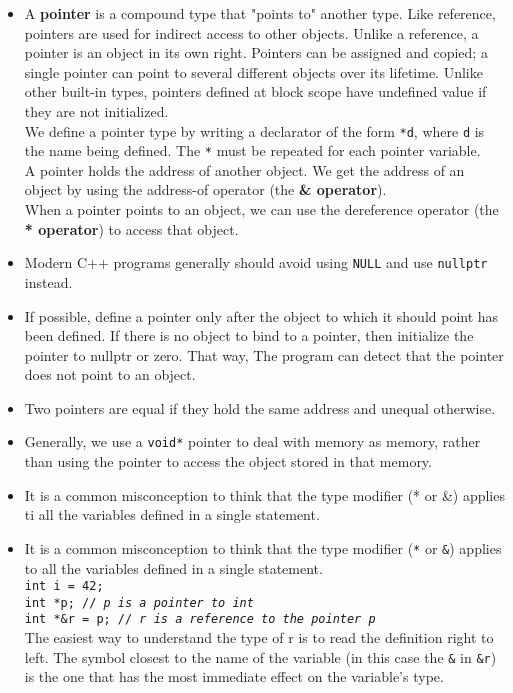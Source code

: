 \begin{itemize}
\item A \textbf{pointer} is a compound type that "points to" another type. Like reference, pointers are used for indirect access to other objects. Unlike a reference, a pointer is an object in its own right. Pointers can be assigned and copied; a single pointer can point to several different objects over its lifetime. Unlike other built-in types, pointers defined at block scope have undefined value if they are not initialized.\\We define a pointer type by writing a declarator of the form \texttt{*d}, where \texttt{d} is the name being defined. The \texttt{*} must be repeated for each pointer variable.\\A pointer holds the address of another object. We get the address of an object by using the address-of operator (the \textbf{\& operator}).\\When a pointer points to an object, we can use the dereference operator (the \textbf{* operator}) to access that object.

\item Modern C++ programs generally should avoid using \texttt{NULL} and use \texttt{nullptr} instead.

\item If possible, define a pointer only after the object to which it should point has been defined. If there is no object to bind to a pointer, then initialize the pointer to nullptr or zero. That way, The program can detect that the pointer does not point to an object.

\item Two pointers are equal if they hold the same address and unequal otherwise.

\item Generally, we use a \texttt{void*} pointer to deal with memory as memory, rather than using the pointer to access the object stored in that memory.

\item It is a common misconception to think that the type modifier (* or \&) applies ti all the variables defined in a single statement.

\item It is a common misconception to think that the type modifier (\texttt{*} or \texttt{\&}) applies to all the variables defined in a single statement.\\\hspace*{1em}\texttt{int i = 42;}\\\hspace*{1em}\texttt{int *p; // \textit{p is a pointer to int}}\\\hspace*{1em}\texttt{int *\&r = p; // \textit{r is a reference to the pointer p}}\\The easiest way to understand the type of r is to read the definition right to left. The symbol closest to the name of the variable (in this case the \texttt{\&} in \texttt{\&r}) is the one that has the most immediate effect on the variable's type.


\end{itemize}
